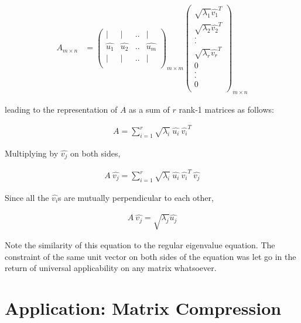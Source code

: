 \documentclass[11pt, a4paper]{article}
\begin{document}
\begin{align*}
	A_{m \times n} &= \begin{pmatrix}
	|         & |         & .. & |         \\
	\hat{u_1} & \hat{u_2} & .. & \hat{u_m} \\
	|         & |         & .. & |         \\        
	\end{pmatrix}_{m \times m} \begin{pmatrix}
	\sqrt{\lambda_1} \hat{v_1}^T \\
	\sqrt{\lambda_2} \hat{v_2}^T \\    
	. \\
	. \\
	\sqrt{\lambda_r} \hat{v_r}^T \\
	0 \\
	. \\
	. \\
	0 \\
	\end{pmatrix}_{m \times n}
\end{align*}

leading to the representation of $A$ as a sum of $r$ rank-1 matrices as follows:

\begin{align*}
	A = \sum_{i=1}^r \sqrt{\lambda_i}\ \hat{u_i}\ \hat{v_i}^T 
\end{align*}

Multiplying by $\hat{v_j}$ on both sides,

\begin{align*}
	A\ \hat{v_j} = \sum_{i=1}^r \sqrt{\lambda_i}\ \hat{u_i}\ \hat{v_i}^T\ \hat{v_j} 
\end{align*}

Since all the $\hat{v_i}$s are mutually perpendicular to each other,

\begin{align*}
	A\ \hat{v_j} = \sqrt{\lambda_j} \hat{u_j} 
\end{align*}

Note the similarity of this equation to the regular eigenvalue equation. The constraint of the same unit vector on both sides of the equation was let go in the return of universal applicability on any matrix whatsoever.

\section{Application: Matrix Compression}
\end{document}
